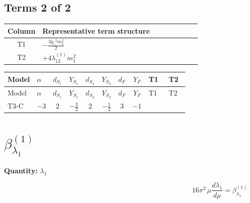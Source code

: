 \documentclass[8pt]{article}
\begin{document}
\begin{landscape}
\subsection*{Terms 2 of 2}
\begin{center}
\begin{tabular}{@{}c >{\raggedright\arraybackslash}p{0.82\linewidth}@{}}
\toprule
Column & Representative term structure \\
\midrule
T1 & \(\displaystyle -\frac{3 {g_1}^2 {m_2^2}}{2}\) \\
\midrule
T2 & \(\displaystyle +4 {\lambda_{12}^{(1)}} {m_1^2}\) \\
\midrule
\bottomrule
\end{tabular}
\end{center}
\smallskip
\tiny
\begin{longtable}{@{}llcccccc >{\raggedright\arraybackslash}p{0.21\linewidth} >{\raggedright\arraybackslash}p{0.21\linewidth}@{}}
\toprule
Model & $\alpha$ & $d_{S_1}$ & $Y_{S_1}$ & $d_{S_2}$ & $Y_{S_2}$ & $d_F$ & $Y_F$ & T1 & T2 \\
\midrule
\endfirsthead
\toprule
Model & $\alpha$ & $d_{S_1}$ & $Y_{S_1}$ & $d_{S_2}$ & $Y_{S_2}$ & $d_F$ & $Y_F$ & T1 & T2 \\
\midrule
\endhead
T3-C & $-3$ & $2$ & $-\frac{3}{2}$ & $2$ & $-\frac{1}{2}$ & $3$ & $-1$ & \scriptsize\adjustbox{max width=\linewidth}{$\begin{gathered} -\frac{3 {g_1}^2 {m_2^2}}{2}\end{gathered}$} & \scriptsize\adjustbox{max width=\linewidth}{$\begin{gathered} +4 {\lambda_{12}^{(1)}} {m_1^2}\end{gathered}$} \\
\midrule
\bottomrule
\end{longtable}
\clearpage
\section*{$\beta_{\lambda_1}^{(1)}$}
\noindent\textbf{Quantity: }$\lambda_1$\par\smallskip
\[16\pi^2\,\mu\frac{d \lambda_1}{d\mu}=\beta_{\lambda_1}^{(1)}\]

\end{landscape}
\end{document}
